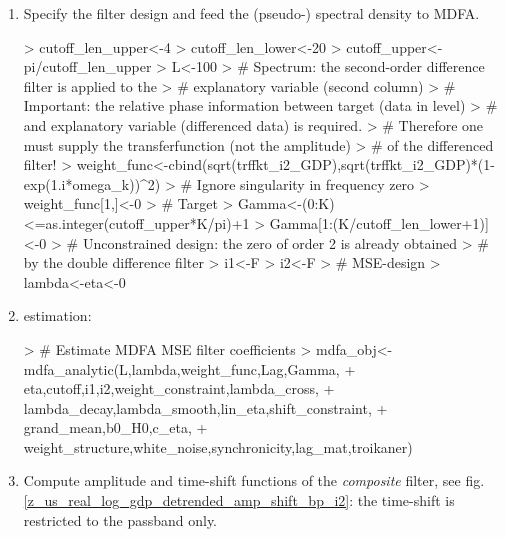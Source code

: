 \documentclass[a4paper]{book}
\begin{document}
\begin{enumerate}
\item Specify the filter design and feed the (pseudo-) spectral density to MDFA.
\begin{Schunk}
\begin{Sinput}
> cutoff_len_upper<-4
> cutoff_len_lower<-20
> cutoff_upper<-pi/cutoff_len_upper
> L<-100
> # Spectrum: the second-order difference filter is applied to the 
> # explanatory variable (second column) 
> #   Important: the relative phase information between target (data in level)
> #   and explanatory variable (differenced data) is required.
> #   Therefore one must supply the transferfunction (not the amplitude) 
> #   of the differenced filter!
> weight_func<-cbind(sqrt(trffkt_i2_GDP),sqrt(trffkt_i2_GDP)*(1-exp(1.i*omega_k))^2)
> # Ignore singularity in frequency zero
> weight_func[1,]<-0
> # Target
> Gamma<-(0:K)<=as.integer(cutoff_upper*K/pi)+1
> Gamma[1:(K/cutoff_len_lower+1)]<-0
> # Unconstrained design: the zero of order 2 is already obtained
> #   by the double difference filter
> i1<-F
> i2<-F
> # MSE-design
> lambda<-eta<-0
\end{Sinput}
\end{Schunk}
\item estimation:
\begin{Schunk}
\begin{Sinput}
> # Estimate MDFA MSE filter coefficients  
> mdfa_obj<-mdfa_analytic(L,lambda,weight_func,Lag,Gamma,
+               eta,cutoff,i1,i2,weight_constraint,lambda_cross,
+               lambda_decay,lambda_smooth,lin_eta,shift_constraint,
+               grand_mean,b0_H0,c_eta,
+               weight_structure,white_noise,synchronicity,lag_mat,troikaner)
\end{Sinput}
\end{Schunk}
\item Compute amplitude and time-shift functions of the \emph{composite} filter, see fig.\ref{z_us_real_log_gdp_detrended_amp_shift_bp_i2}: the time-shift is restricted to the passband only.

\end{enumerate}
\end{document}
